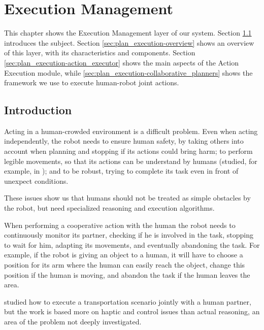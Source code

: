 
\chapter{Execution Management} %

\label{chapter:plan_execution} %


This chapter shows the Execution Management layer of our system. Section \ref{sec:plan_execution-intro} introduces the subject. Section \ref{sec:plan_execution-overview} shows an overview of this layer, with its characteristics and components. Section \ref{sec:plan_execution-action_executor} shows the main aspects of the Action Execution module, while \ref{sec:plan_execution-collaborative_planners} shows the framework we use to execute human-robot joint actions.


\section{Introduction}
\label{sec:plan_execution-intro}
Acting in a human-crowded environment is a difficult problem. Even when acting independently, the robot needs to ensure human safety, by taking others into account when planning and stopping if its actions could bring harm; to perform legible movements, so that its actions can be understand by humans (studied, for example, in \cite{dragan2013legibility}); and to be robust, trying to complete its task even in front of unexpect conditions. 

These issues show us that humans should not be treated as simple obstacles by the robot, but need specialized reasoning and execution algorithms.

When performing a cooperative action with the human the robot needs to continuously monitor its partner, checking if he is involved in the task, stopping to wait for him, adapting its movements, and eventually abandoning the task. For example, if the robot is giving an object to a human, it will have to choose a position for its arm where the human can easily reach the object, change this position if the human is moving, and abandon the task if the human leaves the area.

\cite{bussy2012proactive} studied how to execute a transportation scenario jointly with a human partner, but the work is based more on haptic and control issues than actual reasoning, an area of the problem not deeply investigated.


